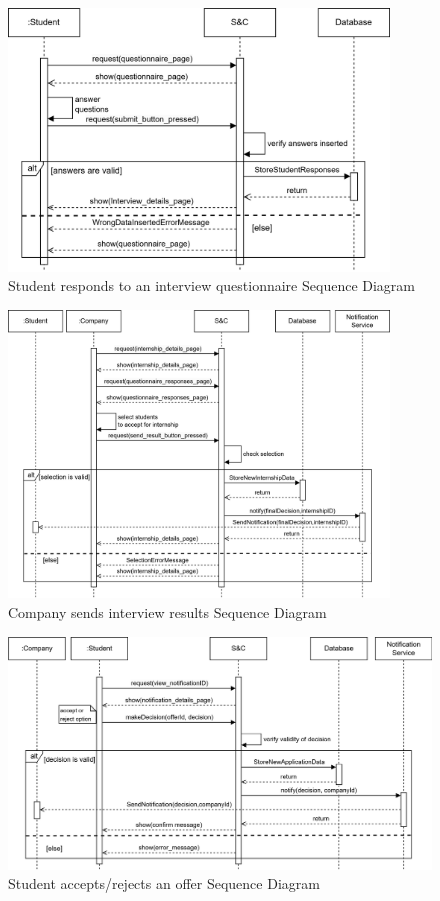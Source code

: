 \begin{figure}[H]
    \centering
    \includegraphics[width=0.9\textwidth]{Images/Sequence_Diagrams/respondQuest_SD.png}
    \caption{Student responds to an interview questionnaire Sequence Diagram}
\end{figure}
\begin{figure}[H]
    \centering
    \includegraphics[width=0.9\textwidth]{Images/Sequence_Diagrams/intResults_SD.png}
    \caption{Company sends interview results Sequence Diagram}
\end{figure}
\begin{figure}[H]
    \centering
    \includegraphics[width=1\textwidth]{Images/Sequence_Diagrams/acceptRej_SD.png}
    \caption{Student accepts/rejects an offer Sequence Diagram}
\end{figure}
